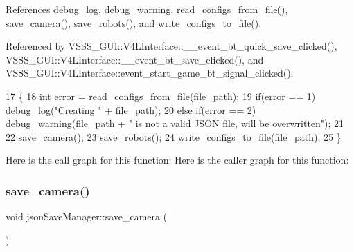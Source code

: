 References debug\+\_\+log, debug\+\_\+warning, read\+\_\+configs\+\_\+from\+\_\+file(), save\+\_\+camera(), save\+\_\+robots(), and write\+\_\+configs\+\_\+to\+\_\+file().



Referenced by V\+S\+S\+S\+\_\+\+G\+U\+I\+::\+V4\+L\+Interface\+::\+\_\+\+\_\+event\+\_\+bt\+\_\+quick\+\_\+save\+\_\+clicked(), V\+S\+S\+S\+\_\+\+G\+U\+I\+::\+V4\+L\+Interface\+::\+\_\+\+\_\+event\+\_\+bt\+\_\+save\+\_\+clicked(), and V\+S\+S\+S\+\_\+\+G\+U\+I\+::\+V4\+L\+Interface\+::event\+\_\+start\+\_\+game\+\_\+bt\+\_\+signal\+\_\+clicked().


\begin{DoxyCode}
17                                                  \{
18     \textcolor{keywordtype}{int} error = \hyperlink{classjson_save_manager_a71683c4903b413a1311e5b10b519ad41}{read\_configs\_from\_file}(file\_path);
19     \textcolor{keywordflow}{if}(error == 1) \hyperlink{debug_8hpp_afde3f42696113719c9ae35507125ee6e}{debug\_log}(\textcolor{stringliteral}{"Creating "} + file\_path);
20     \textcolor{keywordflow}{else} \textcolor{keywordflow}{if}(error == 2) \hyperlink{debug_8hpp_a82185c5a131fe76d2d21364ef6db6144}{debug\_warning}(file\_path + \textcolor{stringliteral}{" is not a valid JSON file, will be
       overwritten"});
21 
22     \hyperlink{classjson_save_manager_a437ba67544a0115bf0242c85b92018b3}{save\_camera}();
23     \hyperlink{classjson_save_manager_ad5acf46f5a0620389055c16c3faa2519}{save\_robots}();
24     \hyperlink{classjson_save_manager_a2be17d434d72a0afeb2d9a2f96b043bf}{write\_configs\_to\_file}(file\_path);
25 \}
\end{DoxyCode}
Here is the call graph for this function\+:
Here is the caller graph for this function\+:
\mbox{\label{classjson_save_manager_a437ba67544a0115bf0242c85b92018b3}} 
\subsubsection{\texorpdfstring{save\+\_\+camera()}{save\_camera()}}
{\footnotesize\ttfamily void json\+Save\+Manager\+::save\+\_\+camera (\begin{DoxyParamCaption}{ }\end{DoxyParamCaption})}



